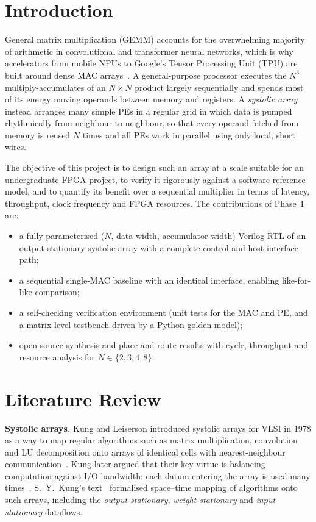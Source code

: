 \documentclass[conference]{IEEEtran}
\begin{document}
\section{Introduction}
General matrix multiplication (GEMM) accounts for the overwhelming majority of
arithmetic in convolutional and transformer neural networks, which is why
accelerators from mobile NPUs to Google's Tensor Processing Unit (TPU) are built
around dense MAC arrays~\cite{jouppi2017tpu,sze2017efficient}. A general-purpose
processor executes the $N^3$ multiply-accumulates of an $N\times N$ product
largely sequentially and spends most of its energy moving operands between
memory and registers. A \emph{systolic array}~\cite{kung1979systolic,kung1982why}
instead arranges many simple PEs in a regular grid in which data is pumped
rhythmically from neighbour to neighbour, so that every operand fetched from
memory is reused $N$ times and all PEs work in parallel using only local,
short wires.

The objective of this project is to design such an array at a scale suitable
for an undergraduate FPGA project, to verify it rigorously against a software
reference model, and to quantify its benefit over a sequential multiplier in
terms of latency, throughput, clock frequency and FPGA resources. The
contributions of Phase~I are:
\begin{itemize}
  \item a fully parameterised ($N$, data width, accumulator width) Verilog
        RTL of an output-stationary systolic array with a complete control and
        host-interface path;
  \item a sequential single-MAC baseline with an identical interface, enabling
        like-for-like comparison;
  \item a self-checking verification environment (unit tests for the MAC and
        PE, and a matrix-level testbench driven by a Python golden model);
  \item open-source synthesis and place-and-route results with cycle,
        throughput and resource analysis for $N\in\{2,3,4,8\}$.
\end{itemize}

\section{Literature Review}
\textbf{Systolic arrays.} Kung and Leiserson introduced systolic arrays for
VLSI in 1978 as a way to map regular algorithms such as matrix multiplication,
convolution and LU decomposition onto arrays of identical cells with nearest-neighbour
communication~\cite{kung1979systolic}. Kung later argued that their key virtue
is balancing computation against I/O bandwidth: each datum entering the array
is used many times~\cite{kung1982why}. S.~Y.~Kung's text~\cite{kung1988vlsi}
formalised space--time mapping of algorithms onto such arrays, including the
\emph{output-stationary}, \emph{weight-stationary} and \emph{input-stationary}
dataflows.
\end{document}
